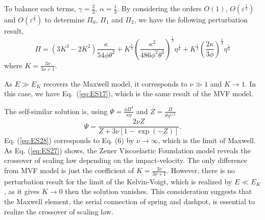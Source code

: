 \documentclass[aps,prl,superscriptaddress]{revtex4}  %
\begin{document}
To balance each terms, $\gamma = \frac{2}{3}$, $\alpha = \frac{1}{3}$. By considering the orders $O\left(1\right)$, $O\left(\varepsilon^{\frac{1}{3}} \right)$ and $O\left(\varepsilon^{\frac{2}{3}} \right)$ to determine $\Pi_0$, $\Pi_1$ and $\Pi_2$, we have the following perturbation result,
\begin{equation}
\Pi = \left(3K^3-2K^2\right) \frac{ \kappa}{54 \phi \theta^2 } + K^{\frac{5}{3}}\left(\frac{\kappa^2 }{486 \phi^2 \theta^{3} }\right)^{\frac{1}{3}} \eta^{\frac{1}{6}} +K^{\frac{1}{3}} \left( \frac{2 \kappa}{3 \phi} \right)^{\frac{1}{3}}\eta^{\frac{1}{3}}
\label{eq:ES27}
\end{equation}
where $K = \frac{3 \nu}{3\nu +1}$. 

As $E \gg E_K $ recovers the Maxwell model, it corresponds to $\nu \gg 1$ and $K \rightarrow 1$. In this case, we have Eq.~(\ref{eq:ES17}), which is the same result of the MVF model.

The self-similar solution is, using $\Psi = \frac{\phi \Pi^3}{\kappa \eta}$ and $Z = \frac{\Pi}{\theta \eta^{1/2}}$
\begin{equation}
\Psi =\frac{2 \nu Z}{Z + 3 \nu \left[1- \exp \left( -Z \right)\right]}.
\label{eq:ES28}
\end{equation}
Eq. (\ref{eq:ES28}) corresponds to Eq. (6) by $\nu \rightarrow \infty$, which is the limit of Maxwell. As Eq. (\ref{eq:ES27}) shows, the Zener Viscoelastic Foundation model reveals the crossover of scaling law depending on the impact-velocity. The only difference from MVF model is just the coefficient of  $K = \frac{3 \nu}{3\nu +1}$. However, there is no perturbation result for the limit of the Kelvin-Voigt, which is realized by  $E \ll E_K $, as it gives $K \rightarrow 0$ then the solution vanishes. This consideration suggests that the Maxwell element, the serial connection of spring and dashpot, is essential to realize the crossover of scaling law.
\end{document}
